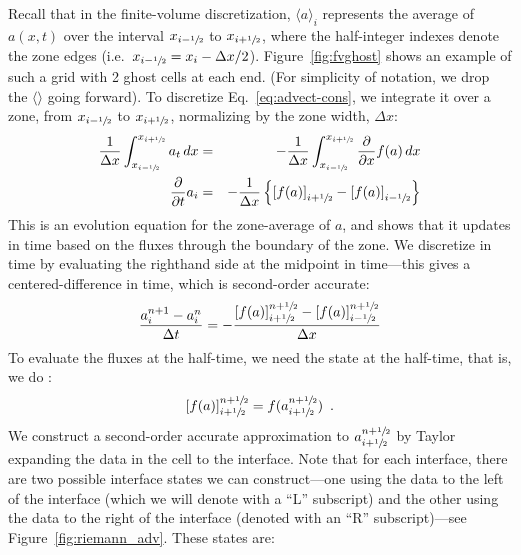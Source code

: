 Recall that in the finite-volume discretization, $\langle a\rangle_i$
represents the average of $a(x,t)$ over the interval $x_{i-\sfrac{1}{2}}$ to
$x_{i+\sfrac{1}{2}}$, where the half-integer indexes denote the zone edges
(i.e.\ $x_{i-\sfrac{1}{2}} = x_i - \Delta x/2$).  Figure~\ref{fig:fvghost}
shows an example of such a grid with 2 ghost cells at each end.  (For
simplicity of notation, we drop the $\langle \rangle$ going forward).
To discretize Eq.~\ref{eq:advect-cons}, we integrate it over a zone,
from ${x_{i-\sfrac{1}{2}}}$ to ${x_{i+\sfrac{1}{2}}}$, normalizing by the zone width,
$\Delta x$:
\begin{eqnarray}
\frac{1}{\Delta x} \int_{x_{i-\sfrac{1}{2}}}^{x_{i+\sfrac{1}{2}}} a_t \, dx &=& 
   - \frac{1}{\Delta x} \int_{x_{i-\sfrac{1}{2}}}^{x_{i+\sfrac{1}{2}}} \frac{\partial}{\partial x} f(a) \, dx \\
\frac{\partial}{\partial t} a_i &=& 
   - \frac{1}{\Delta x} \left \{ \left [f(a) \right ]_{i+\sfrac{1}{2}} - \left [f(a) \right ]_{i-\sfrac{1}{2}} \right \}
\end{eqnarray}
This is an evolution equation for the zone-average of $a$, and shows
that it updates in time based on the fluxes through the boundary of
the zone.  We discretize in time by evaluating the righthand side at
the midpoint in time---this gives a centered-difference in time, which
is second-order accurate:
\begin{equation}
\frac{a_i^{n+1} - a_i^n}{\Delta t} = -\frac{\left [f(a) \right ]_{i+\sfrac{1}{2}}^{n+\sfrac{1}{2}} - \left [f(a) \right ]_{i-\sfrac{1}{2}}^{n+\sfrac{1}{2}}}{\Delta x}
\label{eq:consupdate1d}
\end{equation}
To evaluate the fluxes at the half-time, we need the state at the
half-time, that is, we do :
\begin{equation}
\left [f(a) \right ]_{i+\sfrac{1}{2}}^{n+\sfrac{1}{2}} = f(a_{i+\sfrac{1}{2}}^{n+\sfrac{1}{2}}) \enskip .
\end{equation}
We construct a second-order accurate approximation to
$a_{i+\sfrac{1}{2}}^{n+\sfrac{1}{2}}$ by Taylor expanding the data in the cell to the
interface.  Note that for each interface, there are two possible
interface states we can construct---one using the data to the left of
the interface (which we will denote with a ``L'' subscript) and the
other using the data to the right of the interface (denoted with an
``R'' subscript)---see Figure~\ref{fig:riemann_adv}.  These states are:
